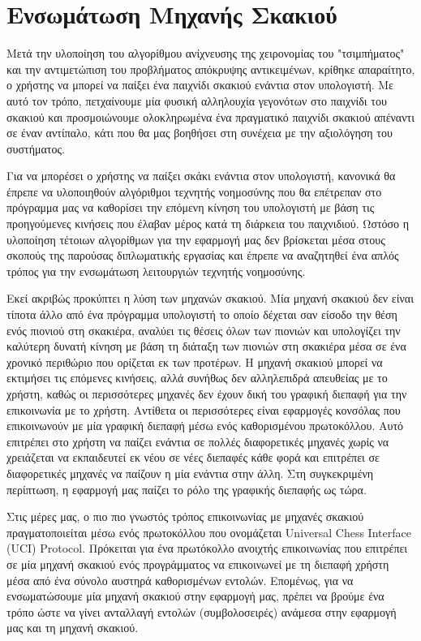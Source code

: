 \section{Ενσωμάτωση Μηχανής Σκακιού}

Μετά την υλοποίηση του αλγορίθμου ανίχνευσης της χειρονομίας του "τσιμπήματος" και την αντιμετώπιση του προβλήματος απόκρυψης αντικειμένων, κρίθηκε απαραίτητο, ο χρήστης να μπορεί να παίξει ένα παιχνίδι σκακιού ενάντια στον υπολογιστή. Με αυτό τον τρόπο, πετχαίνουμε μία φυσική αλληλουχία γεγονότων στο παιχνίδι του σκακιού και προσμοιώνουμε ολοκληρωμένα ένα πραγματικό παιχνίδι σκακιού απέναντι σε έναν αντίπαλο, κάτι που θα μας βοηθήσει στη συνέχεια με την αξιολόγηση του συστήματος. 


Για να μπορέσει ο χρήστης να παίξει σκάκι ενάντια στον υπολογιστή, κανονικά θα έπρεπε να υλοποιηθούν αλγόριθμοι τεχνητής νοημοσύνης που θα επέτρεπαν στο πρόγραμμα μας να καθορίσει την επόμενη κίνηση του υπολογιστή με βάση τις προηγούμενες κινήσεις που έλαβαν μέρος κατά τη διάρκεια του παιχνιδιού. Ωστόσο η υλοποίηση τέτοιων αλγορίθμων για την εφαρμογή μας δεν βρίσκεται μέσα στους σκοπούς της παρούσας διπλωματικής εργασίας και έπρεπε να αναζητηθεί ένα απλός τρόπος για την ενσωμάτωση λειτουργιών τεχνητής νοημοσύνης. 


Εκεί ακριβώς προκύπτει η λύση των μηχανών σκακιού. Μία μηχανή σκακιού δεν είναι τίποτα άλλο από ένα πρόγραμμα υπολογιστή το οποίο δέχεται σαν είσοδο την θέση ενός πιονιού στη σκακιέρα, αναλύει τις θέσεις όλων των πιονιών και υπολογίζει την καλύτερη δυνατή κίνηση με βάση τη διάταξη των πιονιών στη σκακιέρα μέσα σε ένα χρονικό περιθώριο που ορίζεται εκ των προτέρων. Η μηχανή σκακιού μπορεί να εκτιμήσει τις επόμενες κινήσεις, αλλά συνήθως δεν αλληλεπιδρά απευθείας με το χρήστη, καθώς οι περισσότερες μηχανές δεν έχουν δική του γραφική διεπαφή για την επικοινωνία με το χρήστη. Αντίθετα οι περισσότερες είναι εφαρμογές κονσόλας που επικοινωνούν με μία γραφική διεπαφή μέσω ενός καθορισμένου πρωτοκόλλου. Αυτό επιτρέπει στο χρήστη να παίζει ενάντια σε πολλές διαφορετικές μηχανές χωρίς να χρειάζεται να εκπαιδευτεί εκ νέου σε νέες διεπαφές κάθε φορά και επιτρέπει σε διαφορετικές μηχανές να παίζουν η μία ενάντια στην άλλη. Στη συγκεκριμένη περίπτωση, η εφαρμογή μας παίζει το ρόλο της γραφικής διεπαφής ως τώρα. 


Στις μέρες μας, ο πιο πιο γνωστός τρόπος επικοινωνίας με μηχανές σκακιού πραγματοποιείται μέσω ενός πρωτοκόλλου που ονομάζεται Universal Chess Interface (UCI) Protocol. Πρόκειται για ένα πρωτόκολλο ανοιχτής επικοινωνίας που επιτρέπει σε μία μηχανή σκακιού ενός προγράμματος να επικοινωνεί με τη διεπαφή χρήστη μέσα από ένα σύνολο αυστηρά καθορισμένων εντολών. Επομένως, για να ενσωματώσουμε μία μηχανή σκακιού στην εφαρμογή μας, πρέπει να βρούμε ένα τρόπο ώστε να γίνει ανταλλαγή εντολών (συμβολοσειρές) ανάμεσα στην εφαρμογή μας και τη μηχανή σκακιού. 


